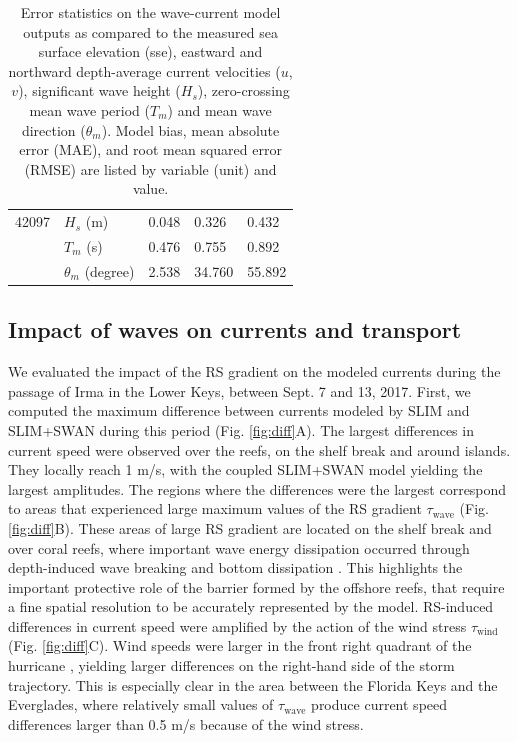 \documentclass[preprint,12pt,authoryear]{elsarticle}
\begin{document}
\begin{table}
\begin{tabular}{|p{2.8cm}p{3cm}p{1.8cm}p{1.8cm}p{1.8cm}|}
        42097 & $H_s$ (m)           &  0.048 &  0.326 &  0.432 \\
              & $T_m$ (s)           &  0.476 &  0.755 &  0.892 \\
              & $\theta_m$ (degree) &  2.538 & 34.760 & 55.892 \\
        \hline
    \end{tabular}
    \caption{Error statistics on the wave-current model outputs as compared to the measured sea surface elevation (sse), eastward and northward depth-average current velocities ($u$,$v$), significant wave height ($H_s$), zero-crossing mean wave period ($T_m$) and mean wave direction ($\theta_m$). Model bias, mean absolute error (MAE), and root mean squared error (RMSE) are listed by variable (unit) and value.}
    \label{tab:stat}
\end{table}

\subsection{Impact of waves on currents and transport}

We evaluated the impact of the RS gradient on the modeled currents during the passage of Irma in the Lower Keys, between Sept. 7 and 13, 2017. First, we computed the maximum difference between currents modeled by SLIM and SLIM+SWAN during this period (Fig. \ref{fig:diff}A). The largest differences in current speed were observed over the reefs, on the shelf break and around islands. They locally reach 1 m/s, with the coupled SLIM+SWAN model yielding the largest amplitudes. The regions where the differences were the largest correspond to areas that experienced large maximum values of the RS gradient {\boldmath$\tau$}$_\text{wave}$ (Fig. \ref{fig:diff}B). These areas of large RS gradient are located on the shelf break and over coral reefs, where important wave energy dissipation occurred through depth-induced wave breaking and bottom dissipation \citep{longuet1964radiation}. This highlights the important protective role of the barrier formed by the offshore reefs, that require a fine spatial resolution to be accurately represented by the model. RS-induced differences in current speed were amplified by the action of the wind stress {\boldmath$\tau$}$_\text{wind}$ (Fig. \ref{fig:diff}C). Wind speeds were larger in the front right quadrant of the hurricane \citep{zedler2009ocean}, yielding larger differences on the right-hand side of the storm trajectory. This is especially clear in the area between the Florida Keys and the Everglades, where relatively small values of {\boldmath$\tau$}$_\text{wave}$ produce current speed differences larger than 0.5 m/s because of the wind stress.
\end{document}
